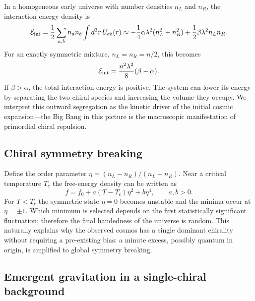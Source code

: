 \documentclass[a4paper,10pt]{article}
\begin{document}
In a homogeneous early universe with number densities $n_L$ and $n_R$, the
interaction energy density is
\begin{equation}
\mathcal{E}_{\rm int}
=\frac12\sum_{a,b}n_a n_b\int d^3r\,U_{ab}(r)
\approx -\frac14\alpha\lambda^2(n_L^2+n_R^2)
+\frac12\beta\lambda^2 n_L n_R.
\label{eq:Eint}
\end{equation}
For an exactly symmetric mixture, $n_L=n_R=n/2$, this becomes
\begin{equation}
\mathcal{E}_{\rm int}=\frac{n^2\lambda^2}{8}(\beta-\alpha).
\label{eq:Esym}
\end{equation}
If $\beta>\alpha$, the total interaction energy is positive. The system can
lower its energy by separating the two chiral species and increasing the
volume they occupy. We interpret this outward segregation as the kinetic
driver of the initial cosmic expansion---the Big Bang in this picture is the
macroscopic manifestation of primordial chiral repulsion.

\subsection{Chiral symmetry breaking}

Define the order parameter $\eta=(n_L-n_R)/(n_L+n_R)$. Near a critical
temperature $T_c$ the free-energy density can be written as
\begin{equation}
f=f_0+a(T-T_c)\eta^2+b\eta^4,\qquad a,b>0.
\label{eq:GL}
\end{equation}
For $T<T_c$ the symmetric state $\eta=0$ becomes unstable and the minima occur
at $\eta=\pm1$. Which minimum is selected depends on the first statistically
significant fluctuation; therefore the final handedness of the universe is
random. This naturally explains why the observed cosmos has a single dominant
chirality without requiring a pre-existing bias: a minute excess, possibly
quantum in origin, is amplified to global symmetry breaking.

\subsection{Emergent gravitation in a single-chiral background}
\end{document}
